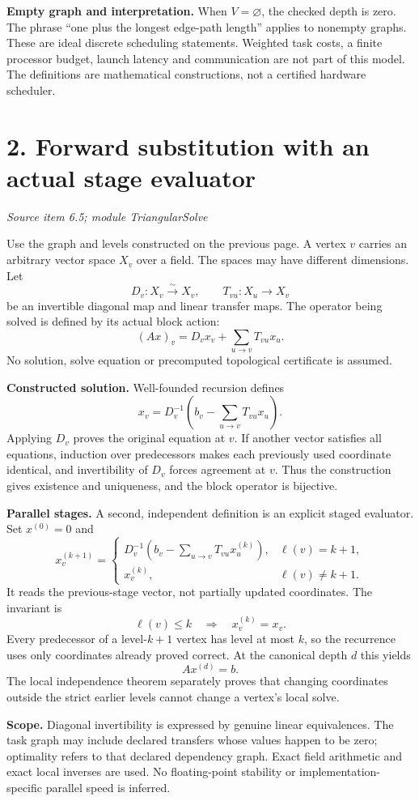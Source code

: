 \documentclass[11pt]{article}
\newcommand{\pageheading}[2]{\section*{\color{ink}#1}\textit{#2}\par}
\begin{document}
\textbf{Empty graph and interpretation.} When $V=\varnothing$, the checked depth is zero. The phrase ``one plus the longest edge-path length'' applies to nonempty graphs. These are ideal discrete scheduling statements. Weighted task costs, a finite processor budget, launch latency and communication are not part of this model. The definitions are mathematical constructions, not a certified hardware scheduler.

\newpage
\pageheading{2. Forward substitution with an actual stage evaluator}{Source item 6.5; module TriangularSolve}
Use the graph and levels constructed on the previous page. A vertex $v$ carries an arbitrary vector space $X_v$ over a field. The spaces may have different dimensions. Let
\[
D_v:X_v\overset{\sim}{\longrightarrow}X_v,
\qquad T_{vu}:X_u\longrightarrow X_v
\]
be an invertible diagonal map and linear transfer maps. The operator being solved is defined by its actual block action:
\[
(Ax)_v=D_vx_v+\sum_{u\to v}T_{vu}x_u.
\]
No solution, solve equation or precomputed topological certificate is assumed.

\textbf{Constructed solution.} Well-founded recursion defines
\[
\boxed{x_v=D_v^{-1}\!\left(b_v-\sum_{u\to v}T_{vu}x_u\right).}
\]
Applying $D_v$ proves the original equation at $v$. If another vector satisfies all equations, induction over predecessors makes each previously used coordinate identical, and invertibility of $D_v$ forces agreement at $v$. Thus the construction gives existence and uniqueness, and the block operator is bijective.

\textbf{Parallel stages.} A second, independent definition is an explicit staged evaluator. Set $x^{(0)}=0$ and
\[
x^{(k+1)}_v=
\begin{cases}
D_v^{-1}\!\left(b_v-\displaystyle\sum_{u\to v}T_{vu}x^{(k)}_u\right),
  &\ell(v)=k+1,\\[5pt]
x^{(k)}_v,&\ell(v)\ne k+1.
\end{cases}
\]
It reads the previous-stage vector, not partially updated coordinates. The invariant is
\[
\ell(v)\leq k\quad\Longrightarrow\quad x^{(k)}_v=x_v.
\]
Every predecessor of a level-$k+1$ vertex has level at most $k$, so the recurrence uses only coordinates already proved correct. At the canonical depth $d$ this yields
\[
\boxed{Ax^{(d)}=b.}
\]
The local independence theorem separately proves that changing coordinates outside the strict earlier levels cannot change a vertex's local solve.

\textbf{Scope.} Diagonal invertibility is expressed by genuine linear equivalences. The task graph may include declared transfers whose values happen to be zero; optimality refers to that declared dependency graph. Exact field arithmetic and exact local inverses are used. No floating-point stability or implementation-specific parallel speed is inferred.
\end{document}
